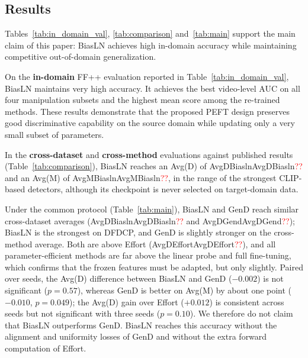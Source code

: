 \documentclass[fonts]{icst}
\newif\ifrevmark\revmarktrue
\newcommand{\rev}[1]{\ifrevmark{\color{revblue}#1}\else#1\fi}
\newenvironment{revblock}{\ifrevmark\color{revblue}\fi}{}
\newcommand{\num}[1]{\ifcsname #1\endcsname\csname #1\endcsname\else\textcolor{red}{??}\fi}
\begin{document}
\subsection{Results}
\label{sec:main}

Tables~\ref{tab:in_domain_val}, \ref{tab:comparison} \rev{and~\ref{tab:main}} support the main claim of this paper: BiasLN achieves high in-domain accuracy while maintaining competitive out-of-domain generalization.

On the \textbf{in-domain} FF++ evaluation reported in Table~\ref{tab:in_domain_val}, BiasLN maintains very high accuracy. It achieves the best video-level AUC on all four manipulation subsets and the highest mean score \rev{among the re-trained methods}. These results \rev{demonstrate} that the proposed PEFT design preserves good discriminative capability on the source domain while updating only a very small subset of parameters.

\begin{revblock}
In the \textbf{cross-dataset} and \textbf{cross-method} evaluations against published results (Table~\ref{tab:comparison}), BiasLN reaches an Avg(D) of \num{AvgDBiasln} and an Avg(M) of \num{AvgMBiasln}, in the range of the strongest CLIP-based detectors, although its checkpoint is never selected on target-domain data.

Under the common protocol (Table~\ref{tab:main}), BiasLN and GenD reach similar cross-dataset averages (\num{AvgDBiasln} and \num{AvgDGend}); BiasLN is the strongest on DFDCP, and GenD is slightly stronger on the cross-method average. Both are above Effort (\num{AvgDEffort}), and all parameter-efficient methods are far above the linear probe and full fine-tuning, which confirms that the frozen features must be adapted, but only slightly. Paired over seeds, the Avg(D) difference between BiasLN and GenD ($-0.002$) is not significant ($p=0.57$), whereas GenD is better on Avg(M) by about one point ($-0.010$, $p=0.049$); the Avg(D) gain over Effort ($+0.012$) is consistent across seeds but not significant with three seeds ($p=0.10$). We therefore do not claim that BiasLN outperforms GenD. BiasLN reaches this accuracy without the alignment and uniformity losses of GenD and without the extra forward computation of Effort.
\end{revblock}

\begin{table}[!t]
  \centering
  \captionsetup{labelsep=period, labelfont=bf, hypcap=false}
  \caption{Ablation study of PEFT variants and the effect of $L_2$ normalization before the linear classifier.
\rev{Video AUC; Avg(D) and Avg(M) are mean $\pm$ standard deviation over $n$ seeds, per-dataset values are seed means. Bold: best; shaded: second best.}}
  \label{tab:ablation}
  \small
  \resizebox{0.85\textwidth}{!}{}
\end{table}
\end{document}
